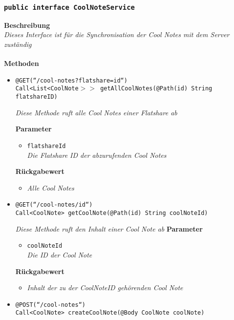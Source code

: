 	\subsubsection{\texttt{public interface CoolNoteService }}
	\textbf{Beschreibung}\\
	\textit{Dieses Interface ist für die Synchronisation der Cool Notes mit dem Server zuständig}\\
\\
	\textbf{Methoden} 
		\begin{itemize}
		\item\texttt{{@GET(``/cool-notes?flatshare={id}``)\\ Call<List<CoolNote$>>$ getAllCoolNotes(@Path(\grqq id\grqq) String flatshareID)}}

		\textit{Diese Methode ruft alle Cool Notes einer Flatshare ab}

	\textbf{Parameter} 
			\begin{itemize}
				\item\texttt{flatshareId}\\
		 		\textit{Die Flatshare ID der abzurufenden Cool Notes}
	 		\end{itemize}
	 		
		\textbf{Rückgabewert} 
	\begin{itemize}
			\item\textit{Alle Cool Notes}
	 	\end{itemize}
	

      \item\texttt{{@GET(``/cool-notes/{id}``)\\ Call<CoolNote> getCoolNote(@Path(\grqq id\grqq) String coolNoteId)}}

		\textit{Diese Methode ruft den Inhalt einer Cool Note ab }
	\textbf{Parameter} 
			\begin{itemize}
				\item\texttt{coolNoteId}\\
		 		\textit{Die ID der Cool Note}
	 		\end{itemize}

		\textbf{Rückgabewert} 
		\begin{itemize}
			\item\textit{Inhalt der zu der CoolNoteID gehörenden Cool Note}
	 	\end{itemize}	

      \item\texttt{{@POST(``/cool-notes``)\\ Call<CoolNote> createCoolNote(@Body CoolNote coolNote)}}


\end{itemize}
